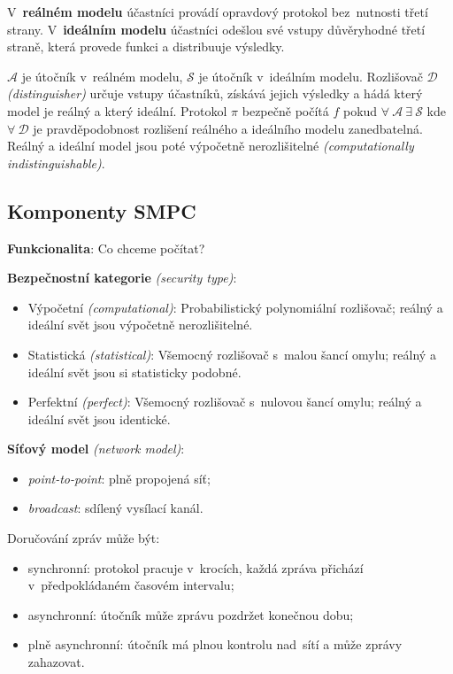 V~\textbf{reálném modelu} účastníci provádí opravdový protokol bez~nutnosti třetí strany.
V~\textbf{ideálním modelu} účastníci odešlou své vstupy důvěryhodné třetí straně, která provede funkci a distribuuje výsledky.

$\mathcal{A}$ je útočník v~reálném modelu, $\mathcal{S}$ je útočník v~ideálním modelu.
Rozlišovač $\mathcal{D}$ \emph{(distinguisher)} určuje vstupy účastníků, získává jejich výsledky a hádá který model je reálný a který ideální.
Protokol $\pi$ bezpečně počítá $f$ pokud $\forall \ \mathcal{A} \ \exists \ \mathcal{S}$ kde $\forall \ \mathcal{D}$ je pravděpodobnost rozlišení reálného a ideálního modelu zanedbatelná.
Reálný a ideální model jsou poté výpočetně nerozlišitelné \emph{(computationally indistinguishable)}.


\subsection{Komponenty SMPC}

\textbf{Funkcionalita}: Co chceme počítat?

\textbf{Bezpečnostní kategorie} \emph{(security type)}:

\begin{itemize}
\item Výpočetní \emph{(computational)}: Probabilistický polynomiální rozlišovač; reálný a ideální svět jsou výpočetně nerozlišitelné.
\item Statistická \emph{(statistical)}: Všemocný rozlišovač s~malou šancí omylu; reálný a ideální svět jsou si statisticky podobné.
\item Perfektní \emph{(perfect)}: Všemocný rozlišovač s~nulovou šancí omylu; reálný a ideální svět jsou identické.
\end{itemize}

\textbf{Síťový model} \emph{(network model)}:

\begin{itemize}
\item \emph{point-to-point}: plně propojená síť;
\item \emph{broadcast}: sdílený vysílací kanál.
\end{itemize}

Doručování zpráv může být:
\begin{itemize}
\item synchronní: protokol pracuje v~krocích, každá zpráva přichází v~předpokládaném časovém intervalu;
\item asynchronní: útočník může zprávu pozdržet konečnou dobu;
\item plně asynchronní: útočník má plnou kontrolu nad~sítí a může zprávy zahazovat.
\end{itemize}

